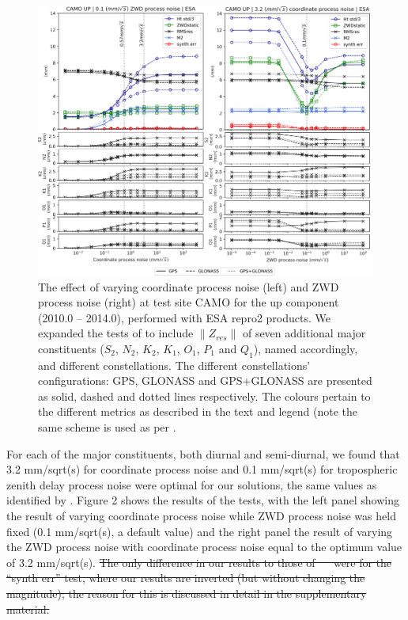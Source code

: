 \documentclass[se, manuscript]{copernicus}
\providecommand{\DIFadd}[1]{{\protect\color{blue}\uwave{#1}}} %
\providecommand{\DIFdel}[1]{{\protect\color{red}\sout{#1}}}                      %
\providecommand{\DIFdelbegin}{} %
\providecommand{\DIFdelend}{} %
\providecommand{\DIFaddFL}[1]{\DIFadd{#1}} %
\providecommand{\DIFaddbeginFL}{} %
\providecommand{\DIFaddendFL}{} %
\begin{document}
\begin{figure}[t]
\includegraphics[width=17cm]{fig02.png}
\caption{The effect of varying coordinate process noise (left) and ZWD process noise (right) at test site CAMO for the up component (2010.0 – 2014.0), performed with ESA repro2 products. We expanded the tests of \cite{Penna2015} to include $\|Z_{res}\|$ of seven additional major constituents ($S_2$, $N_2$, $K_2$, $K_1$, $O_1$, $P_1$ and $Q_1$), named accordingly, and different constellations. \DIFaddbeginFL \DIFaddFL{$\|Z_{res}\|$ is relative to FES2004\_GBe. }\DIFaddendFL The different constellations’ configurations: GPS, GLONASS and GPS+GLONASS are presented as solid, dashed and dotted lines respectively. The colours pertain to the different metrics as described in the text and legend (note the same scheme is used as per \cite{Penna2015}. }
\end{figure}

For each of the major constituents, both diurnal and semi-diurnal, we found that 3.2 mm/sqrt(s) for coordinate process noise and 0.1 mm/sqrt(s) for tropospheric zenith delay process noise were optimal for our solutions, the same values as identified by \cite{Penna2015}. Figure 2 shows the results of the tests, with the left panel showing the result of varying coordinate process noise while ZWD process noise was held fixed (0.1 mm/sqrt(s), a default value) and the right panel the result of varying the ZWD process noise with coordinate process noise equal to the optimum value of 3.2 mm/sqrt(s). 
\DIFdelbegin \DIFdel{The only difference in our results to those of \mbox{%
\cite{Penna2015} }\hspace{0pt}%
were for the “synth err” test, where our results are inverted (but without changing the magnitude); the reason for this is discussed in detail in the supplementary material.
}\DIFdelend 
\end{document}
